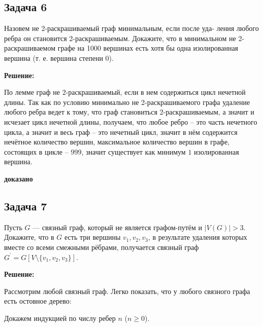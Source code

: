 \documentclass[a4paper,14pt]{article} %
\begin{document}
\begin{center}
\subsection{Задача 6}
\end{center}

 Назовем не 2-раскрашиваемый граф минимальным, если после уда-
ления любого ребра он становится 2-раскрашиваемым. Докажите, что
в минимальном не 2-раскрашиваемом графе на 1000 вершинах есть
хотя бы одна изолированная вершина (т. е. вершина степени 0).
\begin{center}
\bfseries
{\Large Решение: }
\end{center}

По лемме граф не $2$-раскрашиваемый, если в нем содержиться цикл нечетной длины. Так как по условию минимально не 2-раскрашиваемого графа удаление любого ребра ведет к тому, что граф становиться 2-раскрашиваемым, а значит и исчезает цикл нечетной длины, получаем, что любое ребро -- это часть нечетного цикла, а значит и весь граф -- это нечетный цикл, значит в нём содержится нечётное количество вершин, максимальное количество вершин в графе, состоящих в цикле -- $999$, значит существует как минимум $1$ изолированная вершина.\\ 

\begin{flushright}
\begin{large}
\textbf {доказано }
\end{large}
\end{flushright}


\begin{center}
\subsection{Задача 7}
\end{center}

 Пусть $G$ — связный граф, который не является графом-путём и
$|V (G)| > 3$. Докажите, что в $G$ есть три вершины $v_1, v_2, v_3$, в результате
удаления которых вместе со всеми смежными рёбрами, получается
связный граф $G^{\textbf{'}} = G [V \setminus \{v_1,v_2,v_3 \} ]$.
\begin{center}
\bfseries
{\Large Решение: }
\end{center}

Рассмотрим любой связный граф. Легко показать, что у любого связного графа есть остовное дерево:


Докажем индукцией по числу ребер $n$ ($n \geqslant 0$).
\end{document}
